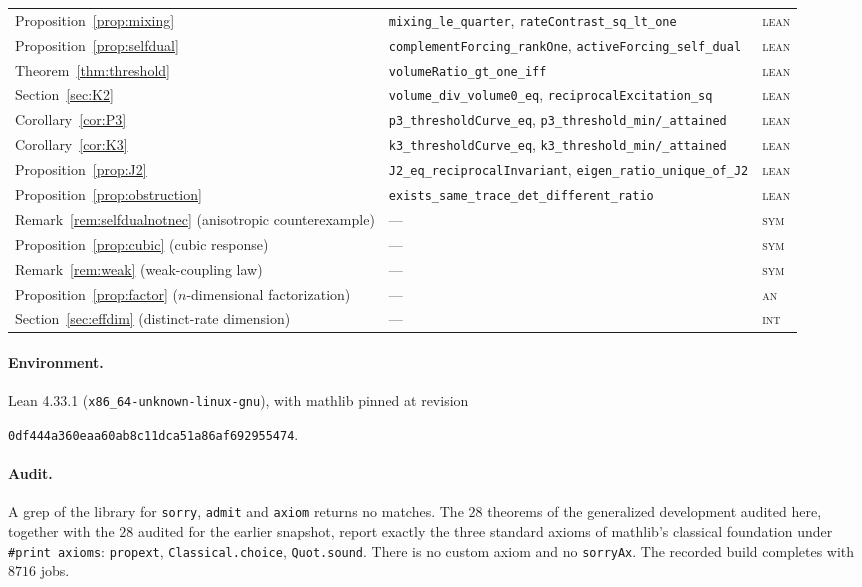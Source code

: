 \documentclass[11pt]{article}
\theoremstyle{plain}
\theoremstyle{definition}
\theoremstyle{remark}
\begin{document}
\begin{table}[t]
\begin{tabular}{@{}l p{} l@{}}
Proposition~\ref{prop:mixing} & \texttt{mixing\_le\_quarter}, \texttt{rateContrast\_sq\_lt\_one} & \textsc{lean}\\
Proposition~\ref{prop:selfdual} & \texttt{complementForcing\_rankOne}, \texttt{activeForcing\_self\_dual} & \textsc{lean}\\
Theorem~\ref{thm:threshold} & \texttt{volumeRatio\_gt\_one\_iff} & \textsc{lean}\\
Section~\ref{sec:K2} & \texttt{volume\_div\_volume0\_eq}, \texttt{reciprocalExcitation\_sq} & \textsc{lean}\\
Corollary~\ref{cor:P3} & \texttt{p3\_thresholdCurve\_eq}, \texttt{p3\_threshold\_min/\_attained} & \textsc{lean}\\
Corollary~\ref{cor:K3} & \texttt{k3\_thresholdCurve\_eq}, \texttt{k3\_threshold\_min/\_attained} & \textsc{lean}\\
Proposition~\ref{prop:J2} & \texttt{J2\_eq\_reciprocalInvariant}, \texttt{eigen\_ratio\_unique\_of\_J2} & \textsc{lean}\\
Proposition~\ref{prop:obstruction} & \texttt{exists\_same\_trace\_det\_different\_ratio} & \textsc{lean}\\
\midrule
Remark~\ref{rem:selfdualnotnec} (anisotropic counterexample) & --- & \textsc{sym}\\
Proposition~\ref{prop:cubic} (cubic response) & --- & \textsc{sym}\\
Remark~\ref{rem:weak} (weak-coupling law) & --- & \textsc{sym}\\
Proposition~\ref{prop:factor} ($n$-dimensional factorization) & --- & \textsc{an}\\
Section~\ref{sec:effdim} (distinct-rate dimension) & --- & \textsc{int}\\
\bottomrule
\end{tabular}
\end{table}

\paragraph{Environment.} Lean 4.33.1 (\texttt{x86\_64-unknown-linux-gnu}), with mathlib pinned at
revision
\begin{center}
\texttt{0df444a360eaa60ab8c11dca51a86af692955474}.
\end{center}

\paragraph{Audit.} A grep of the library for \texttt{sorry}, \texttt{admit} and \texttt{axiom}
returns no matches. The $28$ theorems of the generalized development audited here, together with
the $28$ audited for the earlier snapshot, report exactly the three standard axioms of mathlib's
classical foundation under \texttt{\#print axioms}: \texttt{propext}, \texttt{Classical.choice},
\texttt{Quot.sound}. There is no custom axiom and no \texttt{sorryAx}. The recorded build
completes with $8716$ jobs.
\end{document}
